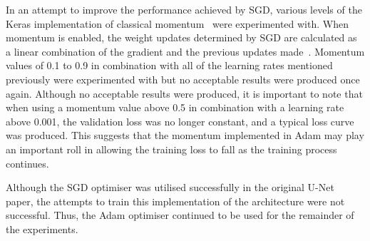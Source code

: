 In an attempt to improve the performance achieved by SGD, various levels of the Keras implementation of classical momentum~\cite{polyak} were experimented with. When momentum is enabled, the weight updates determined by SGD are calculated as a linear combination of the gradient and the previous updates made~\cite{momentum}. Momentum values of 0.1 to 0.9 in combination with all of the learning rates mentioned previously were experimented with but no acceptable results were produced once again. Although no acceptable results were produced, it is important to note that when using a momentum value above 0.5 in combination with a learning rate above 0.001, the validation loss was no longer constant, and a typical loss curve was produced. This suggests that the momentum implemented in Adam may play an important roll in allowing the training loss to fall as the training process continues.

Although the SGD optimiser was utilised successfully in the original U-Net paper, the attempts to train this implementation of the architecture were not successful. Thus, the Adam optimiser continued to be used for the remainder of the experiments.

